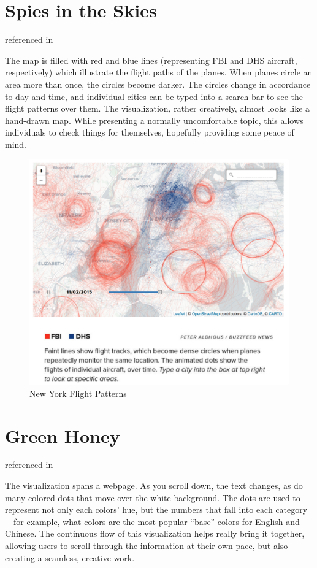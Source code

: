 \documentclass[]{book}
\theoremstyle{definition}
\theoremstyle{definition}
\theoremstyle{definition}
\theoremstyle{remark}
\begin{document}
\section{Spies in the Skies}\label{spies-in-the-skies}

\citep{spies_sky} referenced in \citep{cool_data}

The map is filled with red and blue lines (representing FBI and DHS
aircraft, respectively) which illustrate the flight paths of the planes.
When planes circle an area more than once, the circles become darker.
The circles change in accordance to day and time, and individual cities
can be typed into a search bar to see the flight patterns over them. The
visualization, rather creatively, almost looks like a hand-drawn map.
While presenting a normally uncomfortable topic, this allows individuals
to check things for themselves, hopefully providing some peace of mind.

\begin{figure}
\centering
\includegraphics{images/NYCflights.png}
\caption{New York Flight Patterns}
\end{figure}

\section{Green Honey}\label{green-honey}

\citep{green_honey} referenced in \citep{cool_data}

The visualization spans a webpage. As you scroll down, the text changes,
as do many colored dots that move over the white background. The dots
are used to represent not only each colors' hue, but the numbers that
fall into each category---for example, what colors are the most popular
``base'' colors for English and Chinese. The continuous flow of this
visualization helps really bring it together, allowing users to scroll
through the information at their own pace, but also creating a seamless,
creative work.
\end{document}
